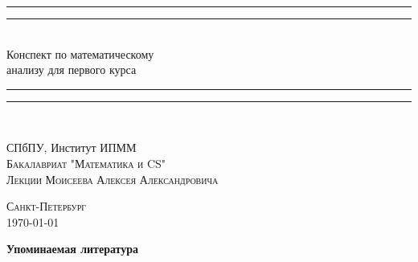 \documentclass{article}
\begin{document}
\thispagestyle{empty}
\begin{center} 
\rule[0.5ex]{\linewidth}{2pt}\vspace*{-\baselineskip}\vspace*{3.2pt} 
\rule[0.5ex]{\linewidth}{1pt}\\[\baselineskip] 
{\huge \sc Конспект по математическому}\\[4mm] 
{\huge \sc анализу для первого курса}\\[4mm] 
\rule[0.5ex]{\linewidth}{1pt}\vspace*{-\baselineskip}\vspace{3.2pt} 
\rule[0.5ex]{\linewidth}{2pt}\\ 
\vspace{6.5mm} 
 
\vspace{4mm} 
{\large СПбПУ, Институт ИПММ\\ 
\smallskip
\smallskip
\textsc{Бакалавриат "Математика и CS"}}\\ 

\vspace{6.5mm} 
{\large\textsc{Лекции Моисеева Алексея Александровича}}\\ 
\vspace{5mm} 

\vspace{20mm} 

\end{center} 
\author{Я}
\begin{center}
\vfill {\large\textsc{Санкт-Петербург}}\\ 
 \today
\end{center}




\newpage

\tableofcontents{}

\newpage
\pagestyle{plain}
\begin{center}
\large \bf Упоминаемая литература
\end{center}
\end{document}
